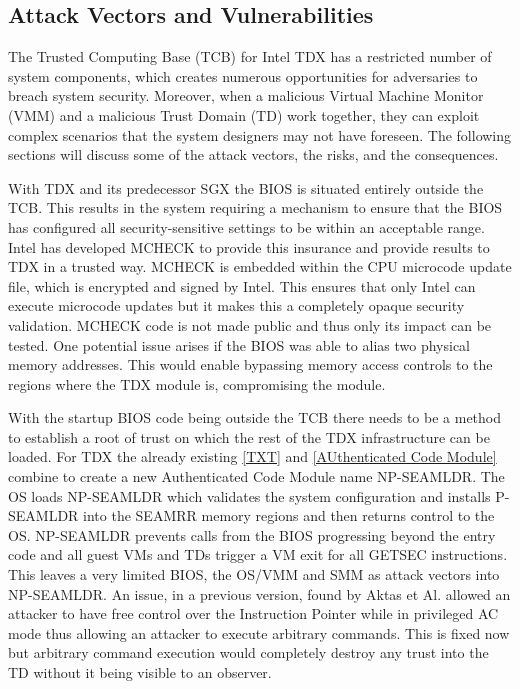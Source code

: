 \subsection{Attack Vectors and Vulnerabilities}


The Trusted Computing Base (TCB) for Intel TDX has a restricted number of system components, which creates numerous opportunities for adversaries to breach system security. Moreover, when a malicious Virtual Machine Monitor (VMM) and a malicious Trust Domain (TD) work together, they can exploit complex scenarios that the system designers may not have foreseen. The following sections will discuss some of the attack vectors, the risks, and the consequences.


With TDX and its predecessor SGX the BIOS is situated entirely outside the TCB. This results in the system requiring a mechanism to ensure that the BIOS has configured all security-sensitive settings to be within an acceptable range. Intel has developed MCHECK to provide this insurance and provide results to TDX in a trusted way. MCHECK is embedded within the CPU microcode update file, which is encrypted and signed by Intel. This ensures that only Intel can execute microcode updates but it makes this a completely opaque security validation. MCHECK code is not made public and thus only its impact can be tested. One potential issue arises if the BIOS was able to alias two physical memory addresses. This would enable bypassing memory access controls to the regions where the TDX module is, compromising the module. 


With the startup BIOS code being outside the \gls{TCB} there needs to be a method to establish a root of trust on which the rest of the TDX infrastructure can be loaded. For TDX the already existing \ref{TXT} and \ref{AUthenticated Code Module} combine to create a new Authenticated Code Module name \Gls{NP-SEAMLDR}. The OS loads \Gls{NP-SEAMLDR} which validates the system configuration and installs \Gls{P-SEAMLDR} into the \Gls{SEAMRR} memory regions and then returns control to the OS. \Gls{NP-SEAMLDR} prevents calls from the BIOS progressing beyond the entry code and all guest VMs and TDs trigger a VM exit for all \Gls{GETSEC} instructions. This leaves a very limited BIOS, the OS/VMM and SMM as attack vectors into \Gls{NP-SEAMLDR}. An issue, in a previous version, found by Aktas et Al. allowed an attacker to have free control over the Instruction Pointer while in privileged AC mode thus allowing an attacker to execute arbitrary commands\cite{aktasIntelTrustDomain}. This is fixed now but arbitrary command execution would completely destroy any trust into the \Gls{TD} without it being visible to an observer.

